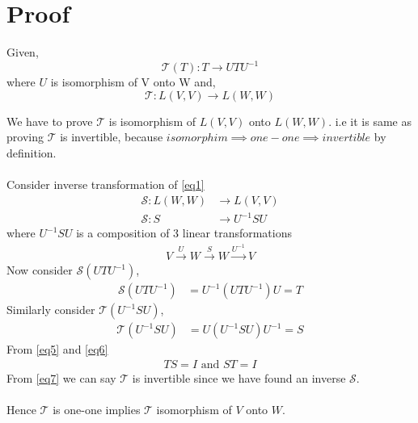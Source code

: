 \documentclass[journal,12pt,twocolumn]{IEEEtran}
\begin{document}
\section{Proof}
Given,
\begin{equation}\label{eq1}
	\mathcal{T}(T): T \rightarrow UTU^{-1}
\end{equation}
where $U$ is isomorphism of V onto W and,
\begin{equation}\label{eq2}
	\mathcal{T}: L(V,V) \rightarrow L(W,W)
\end{equation}

We have to prove $\mathcal{T}$ is isomorphism of $L(V,V)$ onto $L(W,W)$. i.e it is same as proving $\mathcal{T}$ is invertible, because $isomorphim \implies one-one \implies invertible$ by definition.\\
\\
Consider inverse transformation of \eqref{eq1}
\begin{align}\label{eq3}
	\mathcal{S}: L(W,W) &\rightarrow L(V,V)\\
	\mathcal{S}: S &\rightarrow U^{-1}SU
\end{align}
where $U^{-1}SU$ is a composition of 3 linear transformations
\begin{align}\label{eq4}
	V \xrightarrow{U} W \xrightarrow{S} W \xrightarrow{U^{-1}} V
\end{align}
Now consider $\mathcal{S}(UTU^{-1})$,
\begin{align}\label{eq5}
	\mathcal{S}(UTU^{-1}) &= U^{-1}(UTU^{-1})U = T
\end{align}
Similarly consider $\mathcal{T}(U^{-1}SU)$,
\begin{align}\label{eq6}
	\mathcal{T}(U^{-1}SU) &= U(U^{-1}SU)U^{-1} = S
\end{align}
From \eqref{eq5} and \eqref{eq6}
\begin{align}\label{eq7}
	TS = I \text{ and } ST = I
\end{align}
From \eqref{eq7} we can say $\mathcal{T}$ is invertible since we have found an inverse $\mathcal{S}$.\\
\\
Hence $\mathcal{T}$ is one-one implies $\mathcal{T}$ isomorphism of $V$ onto $W$.
\\
\end{document}
